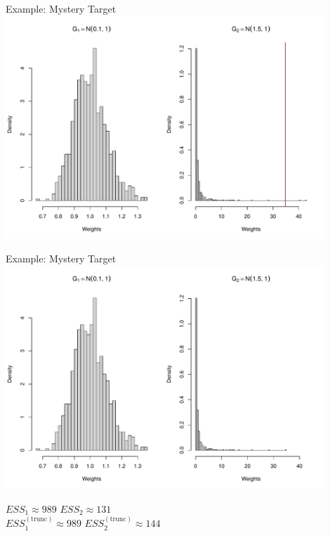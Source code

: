 \documentclass[14pt]{beamer}
\begin{document}
\begin{frame}{Example: Mystery Target}
    \centering
    \includegraphics[height=0.9\textheight, width=0.9\textwidth, keepaspectratio]{Figures/Wt Hist - Thresh.pdf}
\end{frame}


\begin{frame}{Example: Mystery Target}
    \centering
    \includegraphics[height=0.7\textheight, width=0.9\textwidth, keepaspectratio]{Figures/Wt Hist - Trunc.pdf} \newline
    \begin{outline}
        $ESS_1 \approx 989$ \hspace{2.5cm} $ESS_2 \approx 131$\\
        $ESS_1^{(\mathrm{trunc})} \approx 989$ \hspace{2.5cm} $ESS_2^{(\mathrm{trunc})} \approx 144$
    \end{outline}
\end{frame}
\end{document}
